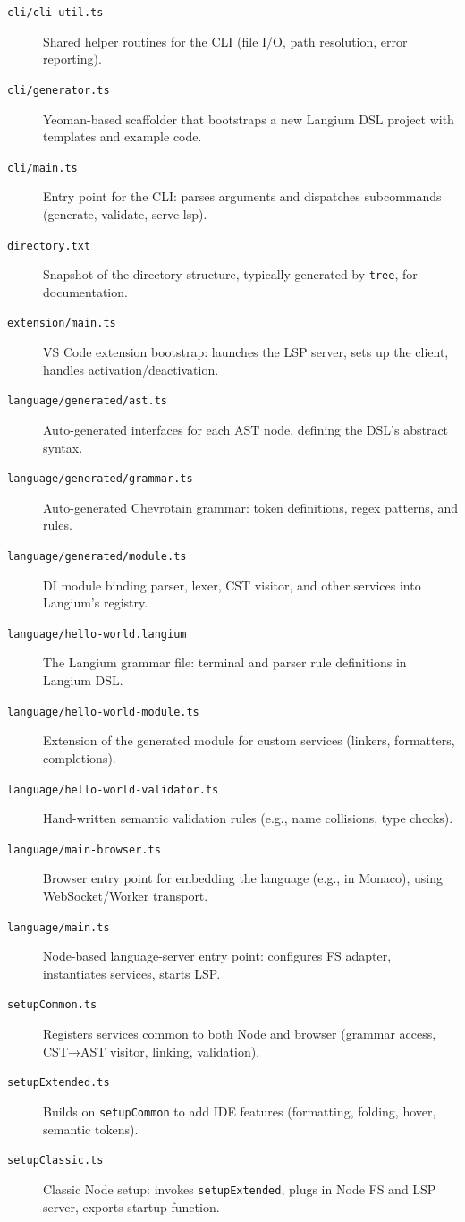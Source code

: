\begin{description}
  \item[\texttt{cli/cli-util.ts}] Shared helper routines for the CLI (file I/O, path resolution, error reporting).
  \item[\texttt{cli/generator.ts}] Yeoman-based scaffolder that bootstraps a new Langium DSL project with templates and example code.
  \item[\texttt{cli/main.ts}] Entry point for the CLI: parses arguments and dispatches subcommands (generate, validate, serve-lsp).
  \item[\texttt{directory.txt}] Snapshot of the directory structure, typically generated by \texttt{tree}, for documentation.
  \item[\texttt{extension/main.ts}] VS Code extension bootstrap: launches the LSP server, sets up the client, handles activation/deactivation.
  \item[\texttt{language/generated/ast.ts}] Auto-generated interfaces for each AST node, defining the DSL’s abstract syntax.
  \item[\texttt{language/generated/grammar.ts}] Auto-generated Chevrotain grammar: token definitions, regex patterns, and rules.
  \item[\texttt{language/generated/module.ts}] DI module binding parser, lexer, CST visitor, and other services into Langium’s registry.
  \item[\texttt{language/hello-world.langium}] The Langium grammar file: terminal and parser rule definitions in Langium DSL.
  \item[\texttt{language/hello-world-module.ts}] Extension of the generated module for custom services (linkers, formatters, completions).
  \item[\texttt{language/hello-world-validator.ts}] Hand-written semantic validation rules (e.g., name collisions, type checks).
  \item[\texttt{language/main-browser.ts}] Browser entry point for embedding the language (e.g., in Monaco), using WebSocket/Worker transport.
  \item[\texttt{language/main.ts}] Node-based language-server entry point: configures FS adapter, instantiates services, starts LSP.
  \item[\texttt{setupCommon.ts}] Registers services common to both Node and browser (grammar access, CST→AST visitor, linking, validation).
  \item[\texttt{setupExtended.ts}] Builds on \texttt{setupCommon} to add IDE features (formatting, folding, hover, semantic tokens).
  \item[\texttt{setupClassic.ts}] Classic Node setup: invokes \texttt{setupExtended}, plugs in Node FS and LSP server, exports startup function.
\end{description}


